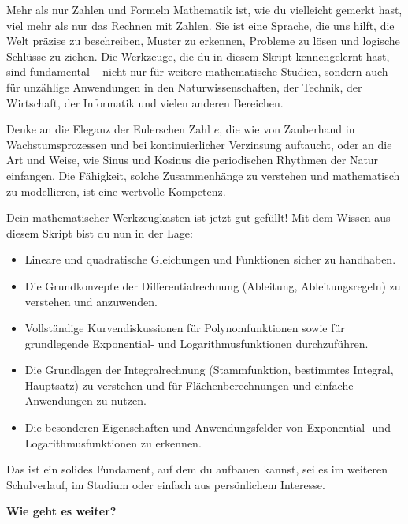\begin{infoboxumgebung}{Mehr als nur Zahlen und Formeln}
Mathematik ist, wie du vielleicht gemerkt hast, viel mehr als nur das Rechnen mit Zahlen. Sie ist eine Sprache, die uns hilft, die Welt präzise zu beschreiben, Muster zu erkennen, Probleme zu lösen und logische Schlüsse zu ziehen. Die Werkzeuge, die du in diesem Skript kennengelernt hast, sind fundamental – nicht nur für weitere mathematische Studien, sondern auch für unzählige Anwendungen in den Naturwissenschaften, der Technik, der Wirtschaft, der Informatik und vielen anderen Bereichen.

Denke an die Eleganz der Eulerschen Zahl $e$, die wie von Zauberhand in Wachstumsprozessen und bei kontinuierlicher Verzinsung auftaucht, oder an die Art und Weise, wie Sinus und Kosinus die periodischen Rhythmen der Natur einfangen. Die Fähigkeit, solche Zusammenhänge zu verstehen und mathematisch zu modellieren, ist eine wertvolle Kompetenz.
\end{infoboxumgebung}

\begin{warumwichtigumgebung}{Dein mathematischer Werkzeugkasten ist jetzt gut gefüllt!}
Mit dem Wissen aus diesem Skript bist du nun in der Lage:
\begin{itemize}
    \item Lineare und quadratische Gleichungen und Funktionen sicher zu handhaben.
    \item Die Grundkonzepte der Differentialrechnung (Ableitung, Ableitungsregeln) zu verstehen und anzuwenden.
    \item Vollständige Kurvendiskussionen für Polynomfunktionen sowie für grundlegende Exponential- und Logarithmusfunktionen durchzuführen.
    \item Die Grundlagen der Integralrechnung (Stammfunktion, bestimmtes Integral, Hauptsatz) zu verstehen und für Flächenberechnungen und einfache Anwendungen zu nutzen.
    \item Die besonderen Eigenschaften und Anwendungsfelder von Exponential- und Logarithmusfunktionen zu erkennen.
\end{itemize}
Das ist ein solides Fundament, auf dem du aufbauen kannst, sei es im weiteren Schulverlauf, im Studium oder einfach aus persönlichem Interesse.
\end{warumwichtigumgebung}

\textbf{Wie geht es weiter?}

